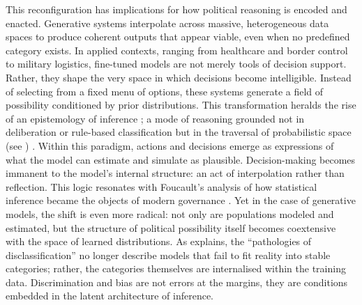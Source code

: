 
This reconfiguration has implications for how political reasoning is encoded and enacted. Generative systems interpolate across massive, heterogeneous data spaces to produce coherent outputs that appear viable, even when no predefined category exists. In applied contexts, ranging from healthcare and border control to military logistics, fine-tuned models are not merely tools of decision support. Rather, they shape the very space in which decisions become intelligible. Instead of selecting from a fixed menu of options, these systems generate a field of possibility conditioned by prior distributions. This transformation heralds the rise of an epistemology of inference ; a mode of reasoning grounded not in deliberation or rule-based classification but in the traversal of probabilistic space (see \cite[4-6]{amoore2024}) . Within this paradigm, actions and decisions emerge as expressions of what the model can estimate and simulate as plausible. Decision-making becomes immanent to the model’s internal structure: an act of interpolation rather than reflection. This logic resonates with Foucault’s analysis of how statistical inference became the objects of modern governance \parencite[108--109]{foucault2009a}. Yet in the case of generative models, the shift is even more radical: not only are populations modeled and estimated, but the structure of political possibility itself becomes coextensive with the space of learned distributions. As \textcite[3-6]{amoore2024} explains, the ``pathologies of disclassification'' no longer describe models that fail to fit reality into stable categories; rather, the categories themselves are internalised within the training data. Discrimination and bias are not errors at the margins, they are conditions embedded in the latent architecture of inference.


